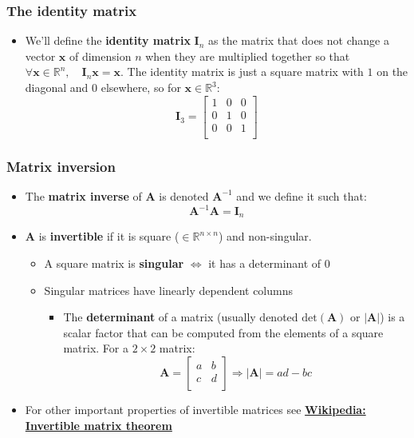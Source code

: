\documentclass{article}
\begin{document}
\begin{multicols*}{2}
\subsubsection{The identity matrix}
\begin{itemize}
    \item We'll define the \textbf{identity matrix} $\bm{I}_n$ as the matrix that does not change a vector $\bm{x}$ of dimension $n$ when they are multiplied together so that $\forall \bm{x} \in \mathbb{R}^n, \quad \bm{I}_n\bm{x}=\bm{x}$. The identity matrix is just a square matrix with $1$ on the diagonal and $0$ elsewhere, so for $\bm{x} \in \mathbb{R}^3$:
     $$ \bm{I}_3 = \begin{bmatrix}
    1 & 0 & 0 \\
    0 & 1 & 0 \\
    0 & 0 & 1 \\ \end{bmatrix} $$\end{itemize}


\subsubsection{Matrix inversion}
\begin{itemize}
    \item The \textbf{matrix inverse} of $\bm{A}$ is denoted $\bm{A}^{-1}$ and we define it such that:
    $$ \bm{A}^{-1}\bm{A} = \bm{I}_n$$
    \item $\bm{A}$ is \textbf{invertible} if it is square ($\in \mathbb{R}^{n \times n}$) and non-singular.
    \begin{itemize}
        \item A square matrix is \textbf{singular} $\iff$  it has a determinant of $0$
        \item Singular matrices have linearly dependent columns
        \begin{itemize}
            \item The \textbf{determinant} of a matrix (usually denoted $\mathrm{det}(\bm{A})$ or $\vert \bm{A}\vert$) is a scalar factor that can be computed from the elements of a square matrix. For a $2\times 2$ matrix:
            $$ \bm{A} =
            \begin{bmatrix}
            a & b \\
            c & d \\ \end{bmatrix}
            \Rightarrow \vert \bm{A} \vert = ad-bc $$
            \end{itemize}
\end{itemize}
    \item For other important properties of invertible matrices see \href{https://en.wikipedia.org/wiki/Invertible_matrix#The_invertible_matrix_theorem}
    {\textbf{Wikipedia: Invertible matrix theorem}}
\end{itemize}

\end{multicols*}
\end{document}
